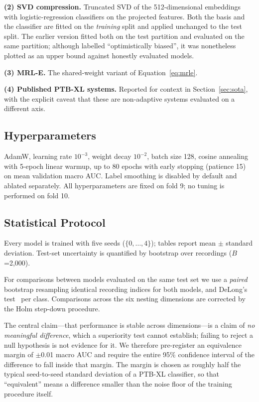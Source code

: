 \textbf{(2) SVD compression.} Truncated SVD of the 512-dimensional embeddings
with logistic-regression classifiers on the projected features. Both the
basis and the classifier are fitted on the \emph{training} split and applied
unchanged to the test split. The earlier version fitted both on the test
partition and evaluated on the same partition; although labelled
``optimistically biased'', it was nonetheless plotted as an upper bound
against honestly evaluated models.

\textbf{(3) MRL-E.} The shared-weight variant of Equation~\ref{eq:mrle}.

\textbf{(4) Published PTB-XL systems.} Reported for context in
Section~\ref{sec:sota}, with the explicit caveat that these are
non-adaptive systems evaluated on a different axis.

\subsection{Hyperparameters}

AdamW, learning rate $10^{-3}$, weight decay $10^{-2}$, batch size 128, cosine
annealing with 5-epoch linear warmup, up to 80 epochs with early stopping
(patience 15) on mean validation macro AUC. Label smoothing is disabled by
default and ablated separately. All hyperparameters are fixed on fold 9; no
tuning is performed on fold 10.

\subsection{Statistical Protocol}
\label{sec:statproto}

Every model is trained with five seeds ($\{0,\dots,4\}$); tables report mean
$\pm$ standard deviation. Test-set uncertainty is quantified by bootstrap over
recordings ($B$=2{,}000).

For comparisons between models evaluated on the same test set we use a
\emph{paired} bootstrap resampling identical recording indices for both
models, and DeLong's test~\cite{delong1988,sun2014} per class. Comparisons
across the six nesting dimensions are corrected by the Holm step-down
procedure.

The central claim---that performance is stable across dimensions---is a claim
of \emph{no meaningful difference}, which a superiority test cannot establish;
failing to reject a null hypothesis is not evidence for it. We therefore
pre-register an equivalence margin of $\pm$0.01 macro AUC and require the
entire 95\% confidence interval of the difference to fall inside that margin.
The margin is chosen as roughly half the typical seed-to-seed standard
deviation of a PTB-XL classifier, so that ``equivalent'' means a difference
smaller than the noise floor of the training procedure itself.

